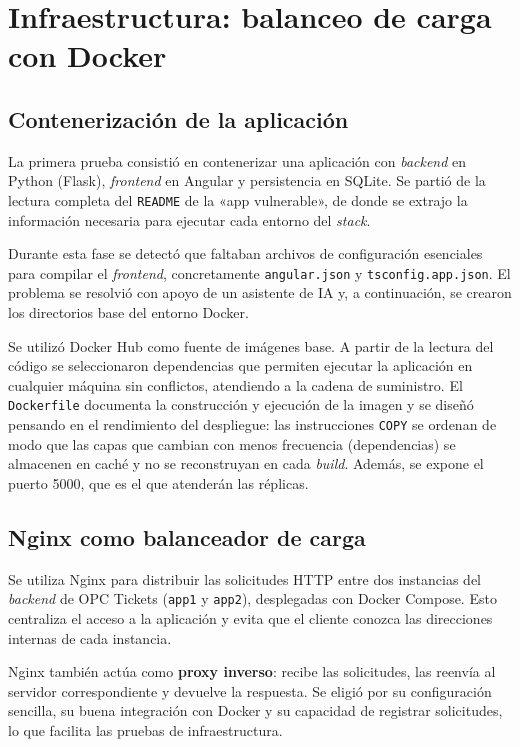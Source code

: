 \documentclass[11pt,letterpaper]{article}
\newcommand{\f}[1]{\texttt{#1}}
\begin{document}
\section{Infraestructura: balanceo de carga con Docker}\label{sec:infra}

\subsection{Contenerización de la aplicación}

La primera prueba consistió en contenerizar una aplicación con \textit{backend} en Python (Flask), \textit{frontend} en Angular y persistencia en SQLite. Se partió de la lectura completa del \f{README} de la «app vulnerable», de donde se extrajo la información necesaria para ejecutar cada entorno del \textit{stack}.

Durante esta fase se detectó que faltaban archivos de configuración esenciales para compilar el \textit{frontend}, concretamente \f{angular.json} y \f{tsconfig.app.json}. El problema se resolvió con apoyo de un asistente de IA y, a continuación, se crearon los directorios base del entorno Docker.

Se utilizó Docker Hub como fuente de imágenes base. A partir de la lectura del código se seleccionaron dependencias que permiten ejecutar la aplicación en cualquier máquina sin conflictos, atendiendo a la cadena de suministro. El \f{Dockerfile} documenta la construcción y ejecución de la imagen y se diseñó pensando en el rendimiento del despliegue: las instrucciones \f{COPY} se ordenan de modo que las capas que cambian con menos frecuencia (dependencias) se almacenen en caché y no se reconstruyan en cada \textit{build}. Además, se expone el puerto 5000, que es el que atenderán las réplicas.

\subsection{Nginx como balanceador de carga}

Se utiliza Nginx para distribuir las solicitudes HTTP entre dos instancias del \textit{backend} de OPC Tickets (\f{app1} y \f{app2}), desplegadas con Docker Compose. Esto centraliza el acceso a la aplicación y evita que el cliente conozca las direcciones internas de cada instancia.

Nginx también actúa como \textbf{proxy inverso}: recibe las solicitudes, las reenvía al servidor correspondiente y devuelve la respuesta. Se eligió por su configuración sencilla, su buena integración con Docker y su capacidad de registrar solicitudes, lo que facilita las pruebas de infraestructura.
\end{document}
